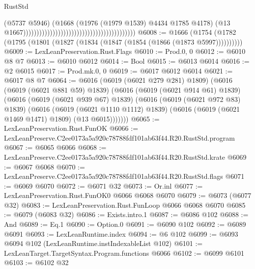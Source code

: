 \begin{lexlean}{RustStd}
\begin{coremodule}
                                                                                    (@5737 @5946)
                                                                                    (@1668
                                                                                      (@1976
                                                                                        (@1979
                                                                                          @1539)
                                                                                        @4434
                                                                                        @1785
                                                                                        @4178)
                                                                                      (@13
                                                                                        @1667))))))))))))))))))))))))))))))))))))))))))
@6008 := @1666 (@1754 (@1782 (@1795 (@1801 (@1827 (@1834 (@1847 (@1854 (@1866 (@1873 @5997))))))))))
@6009 := LexLeanPreservation.Rust.Flags
@6010 := Prod.{0, 0}
@6012 := @6010 @8 @7
@6013 := @6010 @6012
@6014 := Bool
@6015 := @6013 @6014
@6016 := @2 @6015
@6017 := Prod.mk.{0, 0}
@6019 := @6017 @6012 @6014
@6021 := @6017 @8 @7
@6064 := @6016
    (@6019 (@6021 @279 @281) @1809)
    (@6016
      (@6019 (@6021 @881 @59) @1839)
      (@6016
        (@6019 (@6021 @914 @61) @1839)
        (@6016
          (@6019 (@6021 @939 @67) @1839)
          (@6016
            (@6019 (@6021 @972 @83) @1839)
            (@6016
              (@6019 (@6021 @1110 @1112) @1839)
              (@6016 (@6019 (@6021 @1469 @1471) @1809) (@13 @6015)))))))
@6065 := LexLeanPreservation.Rust.FunOK
@6066 := LexLeanPreserve.C2ee0173a5a920c78788fdf101ab63f44.R20.RustStd.program
@6067 := @6065 @6066
@6068 := LexLeanPreserve.C2ee0173a5a920c78788fdf101ab63f44.R20.RustStd.krate
@6069 := @6067 @6068
@6070 := LexLeanPreserve.C2ee0173a5a920c78788fdf101ab63f44.R20.RustStd.flags
@6071 := @6069 @6070
@6072 := @6071 @32
@6073 := Or.inl
@6077 := LexLeanPreservation.Rust.FunOK0 @6066 @6068 @6070
@6079 := @6073 (@6077 @32)
@6083 := LexLeanPreservation.Rust.FunLoop @6066 @6068 @6070
@6085 := @6079 (@6083 @32)
@6086 := Exists.intro.{1}
@6087 := @6086 @102
@6088 := And
@6089 := Eq.{1}
@6090 := Option.{0}
@6091 := @6090 @102
@6092 := @6089 @6091
@6093 := LexLeanRuntime.index
@6094 := @6 @102
@6099 := @6093 @6094 @102 (LexLeanRuntime.instIndexableList @102)
@6101 := LexLeanTarget.TargetSyntax.Program.functions @6066
@6102 := @6099 @6101
@6103 := @6102 @32

\end{coremodule}
\end{lexlean}
